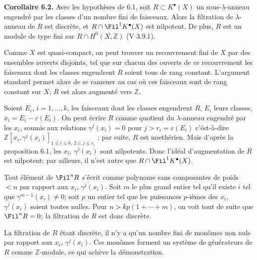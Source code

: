 \textbf{Corollaire 6.2.} Avec les hypothèses de 6.1, soit $R\subset K^{\bullet}(X)$ un sous-$\lambda$-anneau engendré par les classes d'un nombre fini de faisceaux. Alors la filtration de $\lambda$-anneau de $R$ est discrète, et $R\cap\Fil^1K^{\bullet}(X)$ est nilpotent. De plus, $R$ est un module de type fini sur $R\cap H^0(X,\mathbb Z)$ (V 3.9.1).

Comme $X$ est quasi-compact, on peut trouver un recouvrement fini de $X$ par des ensembles ouverts disjoints, tel que sur chacun des ouverts de ce recouvrement les faisceaux dont les classes engendrent $R$ soient tous de rang constant. L'argument standard permet alors de se ramener au cas où ces faisceaux sont de rang constant sur $X$; $R$ est alors augmenté vers $\mathbb Z$.

Soient $E_i$, $i=1,\ldots,k$, les faisceaux dont les classes engendrent $R$, $E_i$ leurs classes, $x_i=E_i-\varepsilon(E_i)$. On peut écrire $R$ comme quotient du $\lambda$-anneau engendré par les $x_i$, soumis aux relations $\gamma^j(x_i)=0$ pour $j>r_i=\varepsilon(E_i)$ c'ést-à-dire $\mathbb Z[x_i,\gamma^j(x_i)]_{1\le i\le k,\,2\le j\le r_i}$ ; par suite, $R$ est noethérien. Mais d'après la proposition 6.1, les $x_i$, $\gamma^j(x_i)$ sont nilpotents. Donc l'idéal d'augmentation de $R$ est nilpotent; par ailleurs, il n'est autre que $R\cap\Fil^1K^{\bullet}(X)$.

Tout élément de $\Fil^n R$ s'écrit comme polynome sans composantes de poids $<n$ par rapport aux $x_i$, $\gamma^j(x_i)$. Soit $m$ le plus grand entier tel qu'il existe $i$ tel que $\gamma^{m-1}(x_i)\ne0$; soit $p$ un entier tel que les puissances $p$-ièmes des $x_i$, $\gamma^j(x_i)$ soient toutes nulles. Pour $n>kp(1+\cdots+m)$, on voit tout de suite que $\Fil^nR=0$; la filtration de $R$ est donc discrète.

La filtration de $R$ étant discrète, il n'y a qu'un nombre fini de monômes non nuls par rapport aux $x_i$, $\gamma^j(x_i)$. Ces monômes forment un système de générateurs de $R$ comme $\mathbb Z$-module, ce qui achève la démonstration.

